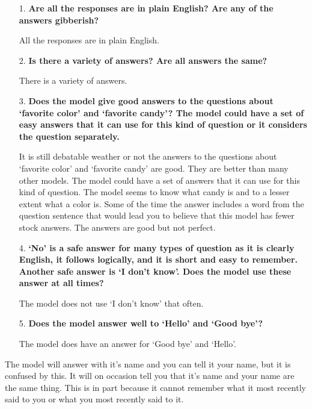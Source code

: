 \begin{itemize}
	\item [1.] \textbf{Are all the responses are in plain English? Are any of the answers gibberish?}
	
	\item []All the responses are in plain English. 
	
	\item [2.] \textbf{Is there a  variety of answers? Are all answers the same?}
	
	\item []There is a variety of answers. 
	
	\item [3.] \textbf{Does the model give good answers to the questions about `favorite color' and `favorite candy'? The model could have a set of easy answers that it can use for this kind of question or it considers the question separately. }
	
	\item []It is still debatable weather or not the answers to the questions about `favorite color' and `favorite candy' are good. They are better than many other models. The model could have a set of answers that it can use for this kind of question. The model seems to know what candy is and to a lesser extent what a color is. Some of the time the answer includes a word from the question sentence that would lead you to believe that this model has fewer stock answers. The answers are good but not perfect.
	
	\item [4.] \textbf{`No' is a safe answer for many types of question as it is clearly English, it follows logically, and it is short and easy to remember. Another safe answer is `I don't know'. Does the model use these answer at all times?}
	
	\item []The model does not use `I don't know' that often. 
	
	\item [5.] \textbf{Does the model answer well to `Hello' and `Good bye'?}
	
	\item []The model does have an answer for `Good bye' and `Hello'.
	
\end{itemize}

The model will answer with it's name and you can tell it your name, but it is confused by this. It will on occasion tell you that it's name and your name are the same thing. This is in part because it cannot remember what it most recently said to you or what you most recently said to it. 

